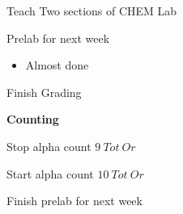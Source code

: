 \documentclass[idxtotoc,hyperref,openany,oneside]{labbook} %
\newcommand{\cmark}{\ding{51}}%
\newcommand{\done}{\rlap{$\square$}{\raisebox{2pt}{\large\hspace{1pt}\cmark}}%
  \hspace{-2.5pt}}
\begin{document}



\begin{todolist}
\item[\done]{Teach Two sections of CHEM Lab}
\item{Prelab for next week}
  \begin{itemize}
  \item{Almost done}
  \end{itemize}
\item[\done]{Finish Grading}
\end{todolist}


\textbf{Counting}
\begin{todolist}
\item[\done]{Stop alpha count $\boxed{9\ Tot\ Or}$}
\item[\done]{Start alpha count $\boxed{10\ Tot\ Or}$}
\end{todolist}




\begin{todolist}
\item[\done]{Finish prelab for next week}
\end{todolist}
\end{document}
